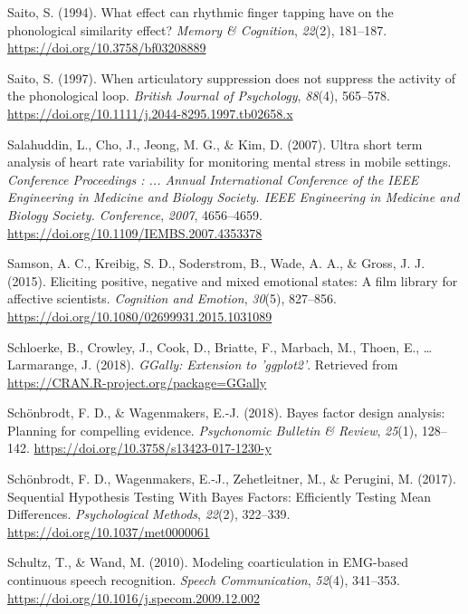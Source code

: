 \documentclass[a4paper,12pt,twoside,onecolumn,openright,final,oldfontcommands]{memoir}
\begin{document}
\leavevmode\hypertarget{ref-saito_what_1994}{}%
Saito, S. (1994). What effect can rhythmic finger tapping have on the phonological similarity effect? \emph{Memory \& Cognition}, \emph{22}(2), 181--187. \url{https://doi.org/10.3758/bf03208889}

\leavevmode\hypertarget{ref-saito_when_1997}{}%
Saito, S. (1997). When articulatory suppression does not suppress the activity of the phonological loop. \emph{British Journal of Psychology}, \emph{88}(4), 565--578. \url{https://doi.org/10.1111/j.2044-8295.1997.tb02658.x}

\leavevmode\hypertarget{ref-Salahuddin2007}{}%
Salahuddin, L., Cho, J., Jeong, M. G., \& Kim, D. (2007). Ultra short term analysis of heart rate variability for monitoring mental stress in mobile settings. \emph{Conference Proceedings : ... Annual International Conference of the IEEE Engineering in Medicine and Biology Society. IEEE Engineering in Medicine and Biology Society. Conference}, \emph{2007}, 4656--4659. \url{https://doi.org/10.1109/IEMBS.2007.4353378}

\leavevmode\hypertarget{ref-samson_eliciting_2015}{}%
Samson, A. C., Kreibig, S. D., Soderstrom, B., Wade, A. A., \& Gross, J. J. (2015). Eliciting positive, negative and mixed emotional states: A film library for affective scientists. \emph{Cognition and Emotion}, \emph{30}(5), 827--856. \url{https://doi.org/10.1080/02699931.2015.1031089}

\leavevmode\hypertarget{ref-R-GGally}{}%
Schloerke, B., Crowley, J., Cook, D., Briatte, F., Marbach, M., Thoen, E., \ldots{} Larmarange, J. (2018). \emph{GGally: Extension to 'ggplot2'}. Retrieved from \url{https://CRAN.R-project.org/package=GGally}

\leavevmode\hypertarget{ref-schonbrodt_bayes_2018}{}%
Schönbrodt, F. D., \& Wagenmakers, E.-J. (2018). Bayes factor design analysis: Planning for compelling evidence. \emph{Psychonomic Bulletin \& Review}, \emph{25}(1), 128--142. \url{https://doi.org/10.3758/s13423-017-1230-y}

\leavevmode\hypertarget{ref-schonbrodt_sequential_2017}{}%
Schönbrodt, F. D., Wagenmakers, E.-J., Zehetleitner, M., \& Perugini, M. (2017). Sequential Hypothesis Testing With Bayes Factors: Efficiently Testing Mean Differences. \emph{Psychological Methods}, \emph{22}(2), 322--339. \url{https://doi.org/10.1037/met0000061}

\leavevmode\hypertarget{ref-schultz_modeling_2010}{}%
Schultz, T., \& Wand, M. (2010). Modeling coarticulation in EMG-based continuous speech recognition. \emph{Speech Communication}, \emph{52}(4), 341--353. \url{https://doi.org/10.1016/j.specom.2009.12.002}
\end{document}
